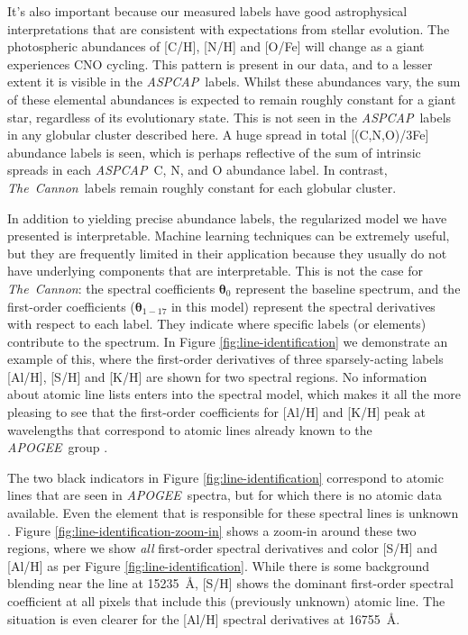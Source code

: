 \documentclass[12pt,preprint]{aastex}
\newcommand{\project}[1]{\textsl{#1}}
\newcommand{\TheCannon}{\project{The~Cannon}}
\newcommand{\acronym}[1]{{\small{#1}}}
\newcommand{\apogee}{\project{\acronym{APOGEE}}}
\newcommand{\aspcap}{\project{\acronym{ASPCAP}}}
\newcommand{\Dvector}[1]{\boldsymbol{#1}}
\newcommand{\vectheta}{\Dvector{\theta}}
\begin{document}
It's also important because our measured labels have good astrophysical
interpretations that are consistent with expectations from stellar
evolution.  The photospheric abundances of [C/H], [N/H] and [O/Fe] 
will change as a giant experiences CNO cycling.  This pattern is
present in our data, and to a lesser extent it is visible in the
\aspcap\ labels.  Whilst these abundances vary, the sum of these
elemental abundances is expected to remain roughly constant for a
giant star, regardless of its evolutionary state.  This is not 
seen in the \aspcap\ labels in any globular cluster described here.  
A huge spread in total [(C,N,O)/3Fe] abundance labels is seen, 
which is perhaps reflective of the sum of intrinsic spreads in
each \aspcap\ C, N, and O abundance label.  In contrast, \TheCannon\
labels remain roughly constant for each globular cluster.


In addition to yielding precise abundance labels, the regularized model
we have presented is interpretable.  Machine learning techniques can be extremely
useful, but they are frequently limited in their application because they
usually do not have underlying components that are interpretable.  This is
not the case for \TheCannon: the spectral coefficients $\vectheta_0$
represent the baseline spectrum, and the first-order coefficients 
($\vectheta_{1-17}$ in this model) represent the spectral derivatives with
respect to each label.  They indicate where specific labels (or elements)
contribute to the spectrum.  In Figure \ref{fig:line-identification} we
demonstrate an example of this, where the first-order derivatives of three
sparsely-acting labels [Al/H], [S/H] and [K/H] are shown for two spectral
regions.  No information about atomic line lists enters into the spectral
model, which makes it all the more pleasing to see that the first-order
coefficients for [Al/H] and [K/H] peak at wavelengths that correspond to
atomic lines already known to the \apogee\ group \citep{Smith_2013}. 


The two black indicators in Figure \ref{fig:line-identification} correspond
to atomic lines that are seen in \apogee\ spectra, but for which there is
no atomic data available.  Even the element that
is responsible for these spectral lines is unknown \citep{apogee_line_list}.
Figure \ref{fig:line-identification-zoom-in} shows a zoom-in around these
two regions, where we show \emph{all} first-order spectral derivatives and
color [S/H] and [Al/H] as per Figure \ref{fig:line-identification}.  While
there is some background blending near the line at 15235~\AA{}, [S/H] shows
the dominant first-order spectral coefficient at all pixels that include
this (previously unknown) atomic line.  The situation is even clearer for
the [Al/H] spectral derivatives at 16755~\AA{}.  
\end{document}
